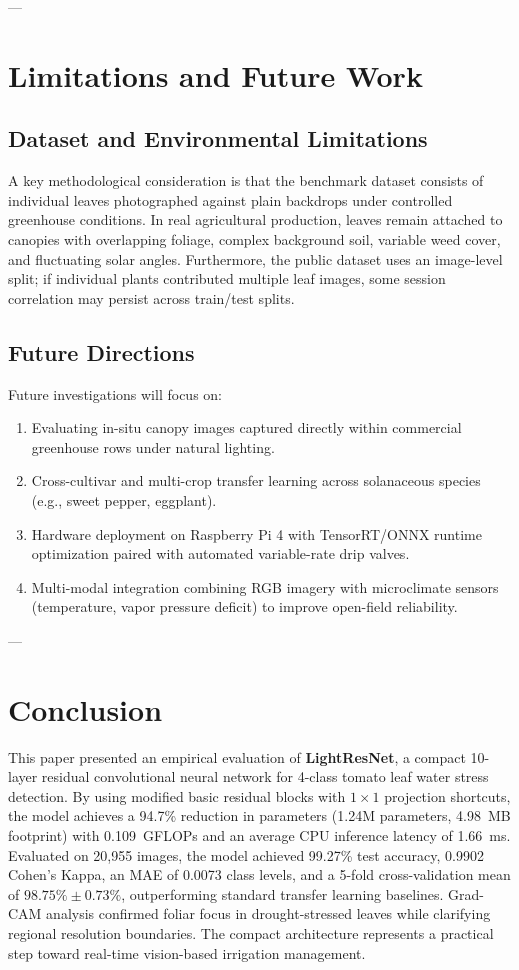 \documentclass[conference]{IEEEtran}
\begin{document}
---

\section{Limitations and Future Work}

\subsection{Dataset and Environmental Limitations}
A key methodological consideration is that the benchmark dataset consists of individual leaves photographed against plain backdrops under controlled greenhouse conditions. In real agricultural production, leaves remain attached to canopies with overlapping foliage, complex background soil, variable weed cover, and fluctuating solar angles. Furthermore, the public dataset uses an image-level split; if individual plants contributed multiple leaf images, some session correlation may persist across train/test splits.

\subsection{Future Directions}
Future investigations will focus on:
\begin{enumerate}
    \item Evaluating in-situ canopy images captured directly within commercial greenhouse rows under natural lighting.
    \item Cross-cultivar and multi-crop transfer learning across solanaceous species (e.g., sweet pepper, eggplant).
    \item Hardware deployment on Raspberry Pi 4 with TensorRT/ONNX runtime optimization paired with automated variable-rate drip valves.
    \item Multi-modal integration combining RGB imagery with microclimate sensors (temperature, vapor pressure deficit) to improve open-field reliability.
\end{enumerate}

---

\section{Conclusion}
This paper presented an empirical evaluation of \textbf{LightResNet}, a compact 10-layer residual convolutional neural network for 4-class tomato leaf water stress detection. By using modified basic residual blocks with $1 \times 1$ projection shortcuts, the model achieves a 94.7\% reduction in parameters (1.24M parameters, 4.98~MB footprint) with 0.109~GFLOPs and an average CPU inference latency of 1.66~ms. Evaluated on 20,955 images, the model achieved 99.27\% test accuracy, 0.9902 Cohen's Kappa, an MAE of 0.0073 class levels, and a 5-fold cross-validation mean of $98.75\% \pm 0.73\%$, outperforming standard transfer learning baselines. Grad-CAM analysis confirmed foliar focus in drought-stressed leaves while clarifying regional resolution boundaries. The compact architecture represents a practical step toward real-time vision-based irrigation management.
\end{document}

